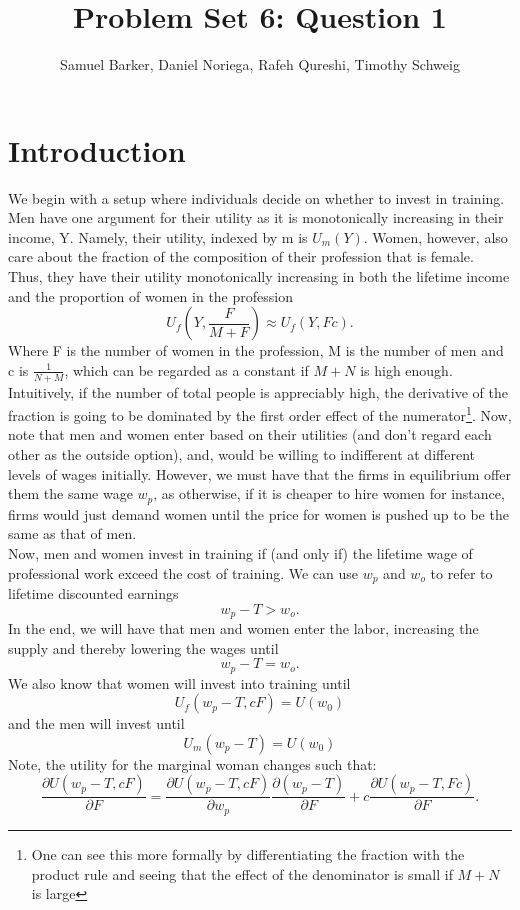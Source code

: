 \documentclass{article}
\title{Problem Set 6: Question 1}
\author{Samuel Barker, Daniel Noriega, Rafeh Qureshi, Timothy Schweig}
\begin{document}
\maketitle

\section*{Introduction}
We begin with a setup where individuals decide on whether to invest in training. Men have one argument for their utility as it is monotonically increasing in their income, Y. Namely, their utility, indexed by m is $U_m(Y)$. Women, however, also care about the fraction of the composition of their profession that is female. Thus, they have their utility monotonically increasing in both the lifetime income and the proportion of women in the profession
$$ U_f \left(Y,\frac{F}{M+F}\right) \approx U_f(Y,Fc).$$
Where F is the number of women in the profession, M is the number of men and c is $\frac{1}{N+M}$, which can be regarded as a constant if $M+N$ is high enough. Intuitively, if the number of total people is appreciably high, the derivative of the fraction is going to be dominated by the first order effect of the numerator\footnote{One can see this more formally by differentiating the fraction with the product rule and seeing that the effect of the denominator is small if $M+N$ is large}. Now, note that men and women enter based on their utilities (and don't regard each other as the outside option), and, would be willing to indifferent at different levels of wages initially. However, we must have that the firms in equilibrium offer them the same wage $w_p$, as otherwise, if it is cheaper to hire women for instance, firms would just demand women until the price for women is pushed up to be the same as that of men. \\ 

Now, men and women invest in training if (and only if) the lifetime wage of professional work exceed the cost of training. We can use $w_p$ and $w_o$ to refer to lifetime discounted earnings
$$ w_p- T>w_o.$$
In the end, we will have that men and women enter the labor, increasing the supply and thereby lowering the wages until 
$$ w_p- T=w_o.$$
\newpage
We also know that women will invest into training until
$$U_f(w_p - T,cF)= U(w_0) $$
and the men will invest until $$U_m(w_p - T)= U(w_0) $$
Note, the utility for the marginal woman changes such that:
$$\frac{\partial U(w_p - T, cF)}{\partial F} = \frac{\partial U(w_p - T, cF)}{\partial w_p}\frac{\partial (w_p-T)}{\partial F} + c\frac{\partial U(w_p - T, Fc)}{\partial F}. $$
\end{document}
